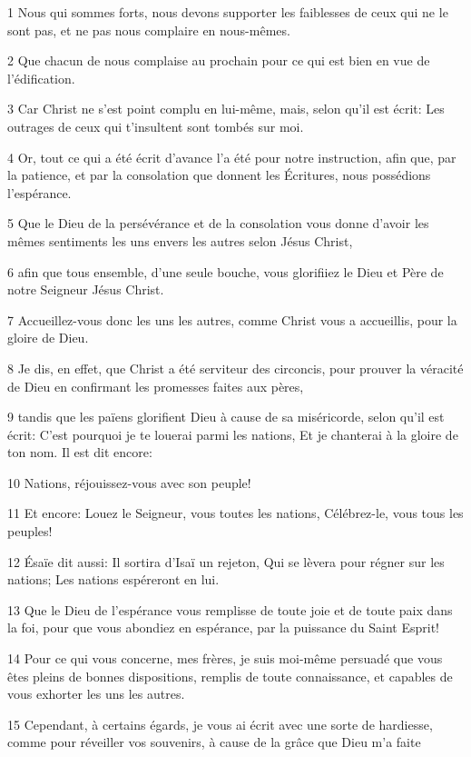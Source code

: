 \par 1 Nous qui sommes forts, nous devons supporter les faiblesses de ceux qui ne le sont pas, et ne pas nous complaire en nous-mêmes.
\par 2 Que chacun de nous complaise au prochain pour ce qui est bien en vue de l'édification.
\par 3 Car Christ ne s'est point complu en lui-même, mais, selon qu'il est écrit: Les outrages de ceux qui t'insultent sont tombés sur moi.
\par 4 Or, tout ce qui a été écrit d'avance l'a été pour notre instruction, afin que, par la patience, et par la consolation que donnent les Écritures, nous possédions l'espérance.
\par 5 Que le Dieu de la persévérance et de la consolation vous donne d'avoir les mêmes sentiments les uns envers les autres selon Jésus Christ,
\par 6 afin que tous ensemble, d'une seule bouche, vous glorifiiez le Dieu et Père de notre Seigneur Jésus Christ.
\par 7 Accueillez-vous donc les uns les autres, comme Christ vous a accueillis, pour la gloire de Dieu.
\par 8 Je dis, en effet, que Christ a été serviteur des circoncis, pour prouver la véracité de Dieu en confirmant les promesses faites aux pères,
\par 9 tandis que les païens glorifient Dieu à cause de sa miséricorde, selon qu'il est écrit: C'est pourquoi je te louerai parmi les nations, Et je chanterai à la gloire de ton nom. Il est dit encore:
\par 10 Nations, réjouissez-vous avec son peuple!
\par 11 Et encore: Louez le Seigneur, vous toutes les nations, Célébrez-le, vous tous les peuples!
\par 12 Ésaïe dit aussi: Il sortira d'Isaï un rejeton, Qui se lèvera pour régner sur les nations; Les nations espéreront en lui.
\par 13 Que le Dieu de l'espérance vous remplisse de toute joie et de toute paix dans la foi, pour que vous abondiez en espérance, par la puissance du Saint Esprit!
\par 14 Pour ce qui vous concerne, mes frères, je suis moi-même persuadé que vous êtes pleins de bonnes dispositions, remplis de toute connaissance, et capables de vous exhorter les uns les autres.
\par 15 Cependant, à certains égards, je vous ai écrit avec une sorte de hardiesse, comme pour réveiller vos souvenirs, à cause de la grâce que Dieu m'a faite
